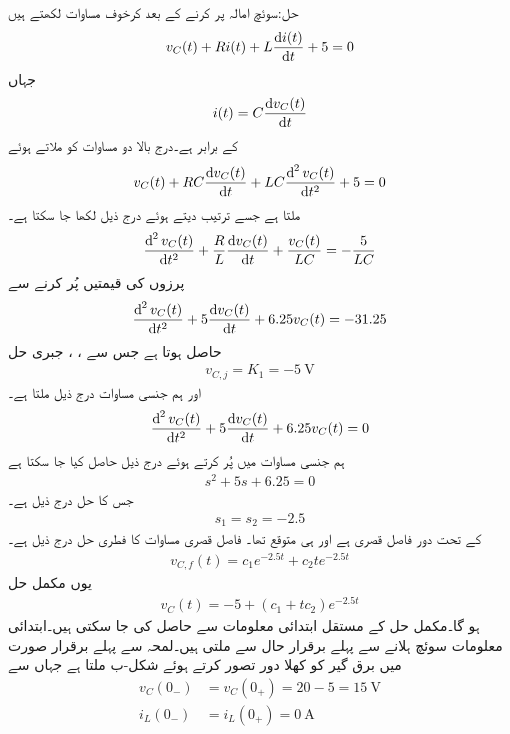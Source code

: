 حل:سوئچ امالہ پر کرنے کے بعد کرخوف مساوات لکھتے ہیں
\begin{align*}
v_C(t)+R i(t)+L\frac{\dif i(t)}{\dif t}+5=0
\end{align*}
جہاں
\begin{align*}
i(t)=C\frac{\dif v_C(t)}{\dif t}
\end{align*}
کے برابر ہے۔درج بالا دو مساوات کو ملاتے ہوئے
\begin{align*}
v_C(t)+RC\frac{\dif v_C(t)}{\dif t}+LC\frac{\dif ^{\, 2}v_C(t)}{\dif t^2}+5=0
\end{align*}
ملتا ہے  جسے ترتیب دیتے ہوئے درج ذیل لکھا جا سکتا ہے۔
\begin{align*}
\frac{\dif ^{\, 2}v_C(t)}{\dif t^2}+\frac{R}{L}\frac{\dif v_C(t)}{\dif t}+\frac{v_C(t)}{LC}=-\frac{5}{LC}
\end{align*}
پرزوں کی قیمتیں پُر کرنے سے
\begin{align*}
\frac{\dif ^{\, 2}v_C(t)}{\dif t^2}+5\frac{\dif v_C(t)}{\dif t}+6.25 v_C(t)=-31.25
\end{align*}
حاصل ہوتا ہے جس سے ، ، جبری حل 
\begin{align*}
v_{C,j}=K_1=\SI{-5}{\volt}
\end{align*}
 اور ہم جنسی مساوات درج ذیل ملتا ہے۔
\begin{align*}
\frac{\dif ^{\, 2}v_C(t)}{\dif t^2}+5\frac{\dif v_C(t)}{\dif t}+6.25 v_C(t)=0
\end{align*}
ہم جنسی مساوات میں  پُر کرتے ہوئے درج ذیل حاصل کیا جا سکتا ہے
\begin{align}
s^2+5s+6.25=0
\end{align}
جس کا حل درج ذیل ہے۔
\begin{align*}
s_1=s_2=-2.5
\end{align*}
 کے تحت  دور فاصل قصری ہے اور  ہی متوقع تھا۔ فاصل قصری مساوات کا فطری حل درج ذیل ہے۔
\begin{align*}
v_{C,f}(t)=c_1e^{-2.5t}+c_2 t e^{-2.5t}
\end{align*}
یوں مکمل حل
\begin{align}\label{مساوات_عارضی_مکمل_حل_مثال_دو_درجی_ب}
v_C(t)=-5+(c_1+tc_2)e^{-2.5t}
\end{align}
ہو گا۔مکمل حل کے مستقل ابتدائی معلومات سے حاصل کی جا سکتی ہیں۔ابتدائی معلومات سوئچ ہلانے سے پہلے برقرار حال سے ملتی ہیں۔لمحہ  سے پہلے برقرار صورت میں برق گیر کو کھلا دور تصور کرتے ہوئے شکل-ب ملتا ہے جہاں سے
\begin{align*}
v_C(0_-)&=v_C(0_+)=20-5=\SI{15}{\volt}\\
i_L(0_-)&=i_L(0_+)=\SI{0}{\ampere}
\end{align*}
